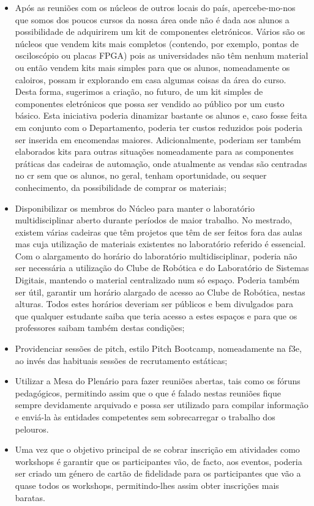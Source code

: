 \begin{itemize}
\item Após as reuniões com os núcleos de outros locais do país, apercebe-mo-nos que somos dos poucos cursos da nossa área onde não é dada aos alunos a possibilidade de adquirirem um kit de componentes eletrónicos. Vários são os núcleos que vendem kits mais completos (contendo, por exemplo, pontas de osciloscópio ou placas FPGA) pois as universidades não têm nenhum material ou então vendem kits mais simples para que os alunos, nomeadamente os caloiros, possam ir explorando em casa algumas coisas da área do curso. Desta forma, sugerimos a criação, no futuro, de um kit simples de componentes eletrónicos que possa ser vendido ao público por um custo básico. Esta iniciativa poderia dinamizar bastante os alunos e, caso fosse feita em conjunto com o Departamento, poderia ter custos reduzidos pois poderia ser inserida em encomendas maiores. Adicionalmente, poderiam ser também elaborados kits para outras situações nomeadamente para as componentes práticas das cadeiras de automação, onde atualmente as vendas são centradas no \acrlong{cr} sem que os alunos, no geral, tenham oportunidade, ou sequer conhecimento, da possibilidade de comprar os materiais;
\item Disponibilizar os membros do Núcleo para manter o laboratório multidisciplinar aberto durante períodos de maior trabalho. No mestrado, existem várias cadeiras que têm projetos que têm de ser feitos fora das aulas mas cuja utilização de materiais existentes no laboratório referido é essencial. Com o alargamento do horário do laboratório multidisciplinar, poderia não ser necessária a utilização do Clube de Robótica e do Laboratório de Sistemas Digitais, mantendo o material centralizado num só espaço. Poderia também ser útil, garantir um horário alargado de acesso ao Clube de Robótica, nestas alturas. Todos estes horários deveriam ser públicos e bem divulgados para que qualquer estudante saiba que teria acesso a estes espaços e para que os professores saibam também destas condições;
\item Providenciar sessões de pitch, estilo Pitch Bootcamp, nomeadamente na \acrshort{f3e}, ao invés das habituais sessões de recrutamento estáticas;
\item Utilizar a Mesa do Plenário para fazer reuniões abertas, tais como os fóruns pedagógicos, permitindo assim que o que é falado nestas reuniões fique sempre devidamente arquivado e possa ser utilizado para compilar informação e enviá-la às entidades competentes sem sobrecarregar o trabalho dos pelouros.
\item Uma vez que o objetivo principal de se cobrar inscrição em atividades como workshops é garantir que os participantes vão, de facto, aos eventos, poderia ser criado um género de cartão de fidelidade para os participantes que vão a quase todos os workshops, permitindo-lhes assim obter inscrições mais baratas.
\end{itemize}